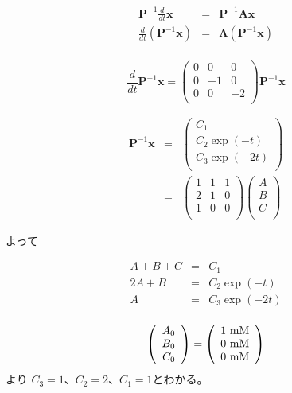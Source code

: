 \begin{eqnarray*}
{\mathbf P}^{-1}\frac{d}{dt}{\mathbf x} & = & {\mathbf P}^{-1}{\mathbf A}{\mathbf x} \\
\frac{d}{dt}({\mathbf P}^{-1}{\mathbf x}) & = & {\mathbf \Lambda}({\mathbf P}^{-1}{\mathbf x}) \\
\end{eqnarray*}

\[
\frac{d}{dt}{\mathbf P}^{-1}{\mathbf x} 
= 
\left(
\begin{array}{rrr}
0 & 0 & 0 \\
0 & -1 & 0 \\
0 & 0 & -2 \\
\end{array}
\right)
{\mathbf P}^{-1}{\mathbf x}
\]

\begin{eqnarray*}
{\mathbf P}^{-1}{\mathbf x} 
& = &
\left(
\begin{array}{c}
C_1 \\
C_2 \exp(-t)\\
C_3 \exp(-2t)\\
\end{array}
\right)\\
 & = &
\left(
\begin{array}{rrr}
1 & 1 & 1 \\
2 & 1 & 0 \\
1 & 0 & 0 \\
\end{array}
\right)
\left(
\begin{array}{rrr}
A\\ 
B\\
C\\
\end{array}
\right)
\end{eqnarray*}

よって

\begin{eqnarray*}
A + B + C & = & C_1 \\
2A + B    & = & C_2 \exp(-t) \\
A         & = & C_3 \exp(-2t)\\ 
\end{eqnarray*}

\[
\left(
\begin{array}{r}
A_0 \\ 
B_0 \\
C_0 \\
\end{array}
\right)
=
\left(
\begin{array}{r}
1\  {\rm mM} \\
0\  {\rm mM} \\
0\  {\rm mM} \\
\end{array}
\right)
\]
より \(C_3 = 1\)、\(C_2 = 2\)、\(C_1 = 1\)とわかる。

